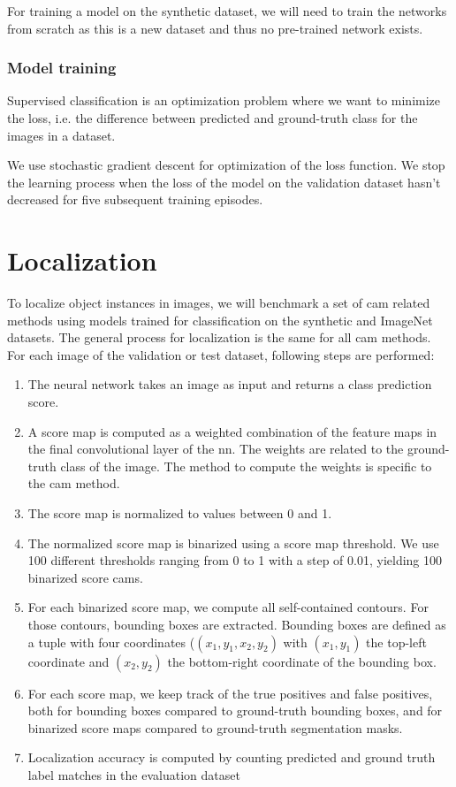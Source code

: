 For training a model on the synthetic dataset, we will need to train the networks from scratch as this is a new dataset and thus no pre-trained network exists.

\subsubsection{Model training}
Supervised classification is an optimization problem where we want to minimize the loss, i.e. the difference between predicted and ground-truth class for the images in a dataset.

We use stochastic gradient descent for optimization of the loss function. We stop the learning process when the loss of the model on the validation dataset hasn't decreased for five subsequent training episodes.

\section{Localization} \label{lb:wsol_methods}
To localize object instances in images, we will benchmark a set of \acrshort{cam} related methods using models trained for classification on the synthetic and ImageNet datasets. The general process for localization is the same for all \acrshort{cam} methods. For each image of the validation or test dataset, following steps are performed:
\begin{enumerate}
    \item The neural network takes an image as input and returns a class prediction score.
    \item A score map is computed as a weighted combination of the feature maps in the final convolutional layer of the \acrshort{nn}. The weights are related to the ground-truth class of the image. The method to compute the weights is specific to the \acrshort{cam} method.
    \item The score map is normalized to values between 0 and 1.
    \item The normalized score map is binarized using a score map threshold. We use 100 different thresholds ranging from 0 to 1 with a step of 0.01, yielding 100 binarized score cams.
    \item For each binarized score map, we compute all self-contained contours. For those contours, bounding boxes are extracted. Bounding boxes are defined as a tuple with four coordinates ($(x_1, y_1, x_2, y_2)$ with $(x_1, y_1)$ the top-left coordinate and $(x_2, y_2)$ the bottom-right coordinate of the bounding box.
    \item For each score map, we keep track of the true positives and false positives, both for bounding boxes compared to ground-truth bounding boxes, and for binarized score maps compared to ground-truth segmentation masks.
    \item Localization accuracy is computed by counting predicted and ground truth label matches in the evaluation dataset
\end{enumerate}
